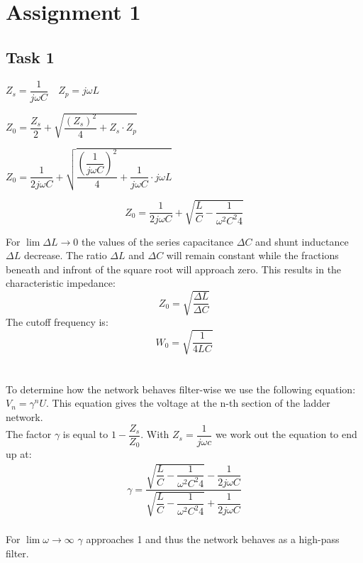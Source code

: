 \documentclass[final]{scrreprt} %
\begin{document}


\chapter{Assignment 1}
\label{ch:sk5-ass1-task1}
\section{Task 1}
\begin{center}
$Z_s = \dfrac{1}{j \omega C}$\,\,\,\, $Z_p = j \omega L$

$Z_0 = \dfrac{Z_s}{2} + \sqrt{\dfrac{(Z_s)^2}{4} + Z_s \cdot Z_p}$

$Z_0 = \dfrac{1}{2j \omega C} + \sqrt{\dfrac{(\dfrac{1}{j \omega C})^2}{4} + \dfrac{1}{j \omega C} \cdot j \omega L}$

\begin{equation}
Z_0 = \dfrac{1}{2j \omega C} + \sqrt{\dfrac{L}{C} - \dfrac{1}{\omega^2 C^2 4}}
\end{equation}
\end{center}
For $\lim{\Delta  L\to 0}$ the values of the series capacitance $\Delta C$ and shunt inductance $\Delta L$ decrease. The ratio $\Delta L$ and $\Delta C$ will remain constant while the fractions beneath and infront of the square root will approach zero. 
This results in the characteristic impedance:
\begin{equation}
Z_0 = \sqrt{\dfrac{\Delta L}{\Delta C}}
\end{equation}
The cutoff frequency is:
\begin{equation}
W_0 = \sqrt{\dfrac{1}{4LC}}
\end{equation}\\
\\
To determine how the network behaves filter-wise we use the following equation: $V_n = \gamma^n U$. 
This equation gives the voltage at the n-th section of the ladder network.\\
The factor $\gamma$ is equal to $1 - \dfrac{Z_s}{Z_0}$.
With $Z_s = \dfrac{1}{j \omega c}$ we work out the equation to end up at:
\begin{align}
\gamma = \dfrac{\sqrt{\dfrac{L}{C} - \dfrac{1}{\omega^2 C^2 4}} - \dfrac{1}{2j \omega C}}{\sqrt{\dfrac{L}{C} - \dfrac{1}{\omega^2 C^2 4}} + \dfrac{1}{2j \omega C}}
\end{align}
\\For $\lim{\omega \to \infty}$ $\gamma$ approaches 1 and thus the network behaves as a high-pass filter.
\end{document}
